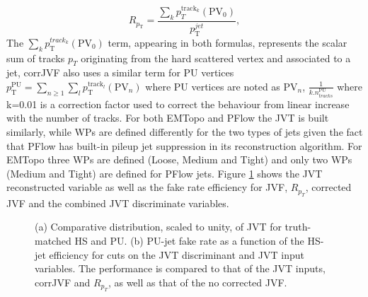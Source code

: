 \begin{equation}
    R_{p_{\mathrm{T}}}=\frac{\sum_{k} p_{T}^{\mathrm{track}_{k}}\left(\mathrm{PV}_{0}\right)}{p_{\mathrm{T}}^{j e t}},
\end{equation}
The  $\sum_{k} p_{\mathrm{T}}^{{track}_{k}}\left(\mathrm{PV}_{0}\right)$ term, appearing in both formulas, represents the scalar sum of tracks $p_T$ originating from the hard scattered vertex and associated to a jet, corrJVF also uses a similar term for PU vertices $p_{\mathrm{T}}^{\mathrm{PU}}=\sum_{n \geq 1} \sum_{l} p_{\mathrm{T}}^{\mathrm{track}_{l}}\left(\mathrm{PV}_{n}\right)$  where PU vertices are noted as $\mathrm{PV}_{n}$, $\frac{1}{k . n_{tracks }^{\mathrm{PU}}}$ where k=0.01 is a correction factor used to correct the behaviour from linear increase with the number of tracks. For both EMTopo and PFlow the JVT is built similarly, while WPs are defined differently for the two types of jets given the fact that PFlow has built-in pileup jet suppression in its reconstruction algorithm. For EMTopo three WPs are defined (Loose, Medium and Tight) and only two WPs (Medium and Tight) are defined for PFlow jets. Figure \ref{fig:Jet:Tag:JVT} shows the JVT reconstructed variable as well as the fake rate efficiency for JVF, $R_{p_T}$, corrected JVF and the combined JVT discriminate variables.
\begin{figure}[htbp]
    \centering
    \caption{(a) Comparative distribution, scaled to unity, of JVT for truth-matched HS and PU. (b) PU-jet fake rate as a function of the HS-jet efficiency for cuts on the JVT discriminant and JVT input variables. The performance is compared to that of the JVT inputs, corrJVF and $R_{p_T}$, as well as that of the no corrected JVF.}
    \label{fig:Jet:Tag:JVT}
\end{figure}

